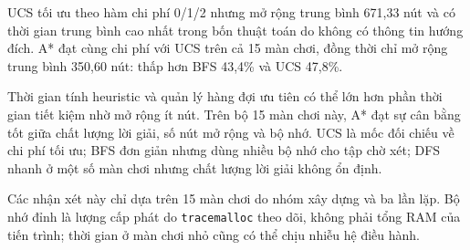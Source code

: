 UCS tối ưu theo hàm chi phí 0/1/2 nhưng mở rộng trung bình 671,33 nút và có
thời gian trung bình cao nhất trong bốn thuật toán do không có thông tin hướng
đích. A* đạt cùng chi phí với UCS trên cả 15 màn chơi, đồng thời chỉ mở rộng
trung bình 350,60 nút: thấp hơn BFS 43,4\% và UCS 47,8\%.

Thời gian tính heuristic và quản lý hàng đợi ưu tiên có thể lớn hơn phần thời
gian tiết kiệm nhờ mở rộng ít nút. Trên bộ 15 màn chơi này, A* đạt sự cân bằng
tốt giữa chất lượng lời giải, số nút mở rộng và bộ nhớ. UCS là mốc đối chiếu về
chi phí tối ưu; BFS đơn giản nhưng dùng nhiều bộ nhớ cho tập chờ xét; DFS nhanh
ở một số màn chơi nhưng chất lượng lời giải không ổn định.

Các nhận xét này chỉ dựa trên 15 màn chơi do nhóm xây dựng và ba lần lặp. Bộ
nhớ đỉnh là lượng cấp phát do \texttt{tracemalloc} theo dõi, không phải tổng
RAM của tiến trình; thời gian ở màn chơi nhỏ cũng có thể chịu nhiễu hệ điều
hành.
